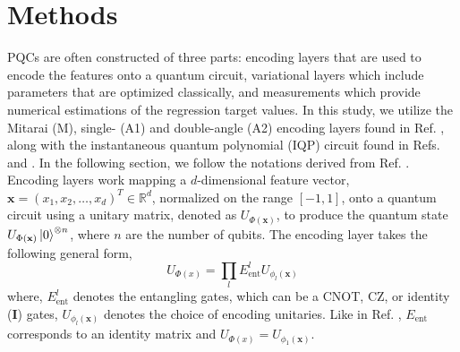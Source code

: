 \documentclass[journal=jacsat,manuscript=article]{achemso}
\begin{document}
\section{Methods}
PQCs are often constructed of three parts: encoding layers that are used to encode the features onto a quantum circuit, variational layers which include parameters that are optimized classically, and measurements which provide numerical estimations of the regression target values.\citep{suzuki_predicting_2020} 
In this study, we utilize the Mitarai (M)\cite{mitarai_quantum_2018}, single- (A1) and double-angle (A2) encoding layers found in Ref. \citep{suzuki_predicting_2020}, along with the instantaneous quantum polynomial (IQP) circuit found in Refs. \citep{bremner_average-case_2016} and \citep{havlicek_supervised_2019}.
In the following section, we follow the notations derived from  Ref. \citep{suzuki_predicting_2020}.
Encoding layers work mapping a $d$-dimensional feature vector, $\mathbf{x}=(x_{1}, x_{2}, \ldots, x_{d})^{T} \in \mathbb{R}^{d}$, normalized on the range $[-1,1]$, onto a quantum circuit using a unitary matrix, denoted as $U_{\Phi(\mathbf{x})}$, to produce the quantum state $U_{\Phi(\mathbf{x})}\ket{0}^{\otimes n}$, where $n$ are the number of qubits.
The encoding layer takes the following general form,
\begin{equation}
	U_{\Phi(x)} =  \prod_{l} E_{\text{ent}}^{l} U_{\phi_{l}(\mathbf{x})}
	\label{eq:general_encoding}
\end{equation}
where, $E_{\text{ent}}^{l}$ denotes the entangling gates, which can be a CNOT, CZ, or identity ($\mathbf{I}$) gates,   $U_{\phi_{l}(\mathbf{x})}$ denotes the choice of encoding unitaries. 
Like in  Ref. \citep{suzuki_predicting_2020}, $E_{\text{ent}}$ corresponds to an identity matrix and $U_{\Phi(x)} = U_{\phi_{1}(\mathbf{x})}$.

\end{document}

